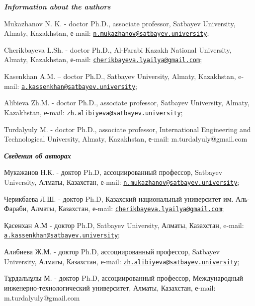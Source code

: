 \begin{authorinfo}
\hspace{1em}\emph{{\bfseries Information about the authors}}

Mukazhanov N. K. - doctor Ph.D., associate professor, Satbayev
University, Almaty, Kazakhstan, е-mail:
\href{mailto:n.mukazhanov@satbayev.university}{\nolinkurl{n.mukazhanov@satbayev.university}};

Cherikbayeva L.Sh. - doctor Ph.D., Al-Farabi Kazakh National University,
Almaty, Kazakhstan, е-mail:
\href{mailto:cherikbayeva.lyailya@gmail.com}{\nolinkurl{cherikbayeva.lyailya@gmail.com}};

Kasenkhan A.M. -- doctor Ph.D., Satbayev University, Almaty, Kazakhstan,
e-mail:
\href{mailto:a.kassenkhan@satbayev.university}{\nolinkurl{a.kassenkhan@satbayev.university}};

Alibieva Zh.M. - doctor Ph.D., associate professor, Satbayev University,
Almaty, Kazakhstan, е-mail:
\href{mailto:zh.alibiyeva@satbayev.university}{\nolinkurl{zh.alibiyeva@satbayev.university}};

Turdalyuly M. - doctor Ph.D., associate professor, International
Engineering and Technological University, Almaty, Kazakhstan, е-mail:
m.turdalyuly@gmail.com

\hspace{1em}\emph{{\bfseries Сведения об авторах}}

Мукажанов Н.К. - доктор Ph.D, ассоциированный профессор, Satbayev
University, Алматы, Казахстан, е-mail:
\href{mailto:n.mukazhanov@satbayev.university}{\nolinkurl{n.mukazhanov@satbayev.university}};

Черикбаева Л.Ш. - доктор Ph.D, Казахский национальный университет им.
Аль-Фараби, Алматы, Казахстан, е-mail:
\href{mailto:cherikbayeva.lyailya@gmail.com}{\nolinkurl{cherikbayeva.lyailya@gmail.com}};

Қасенхан А.М - доктор Ph.D, Satbayev University, Алматы, Казахстан,
e-mail:
\href{mailto:a.kassenkhan@satbayev.university}{\nolinkurl{a.kassenkhan@satbayev.university}};

Алибиева Ж.М. - доктор Ph.D, ассоциированный профессор, Satbayev
University, Алматы, Казахстан, е-mail:
\href{mailto:zh.alibiyeva@satbayev.university}{\nolinkurl{zh.alibiyeva@satbayev.university}};

Тұрдалыұлы М. - доктор Ph.D, ассоциированный профессор, Международный
инженерно-технологический университет, Алматы, Казахстан, е-mail:
m.turdalyuly@gmail.com
\end{authorinfo}
